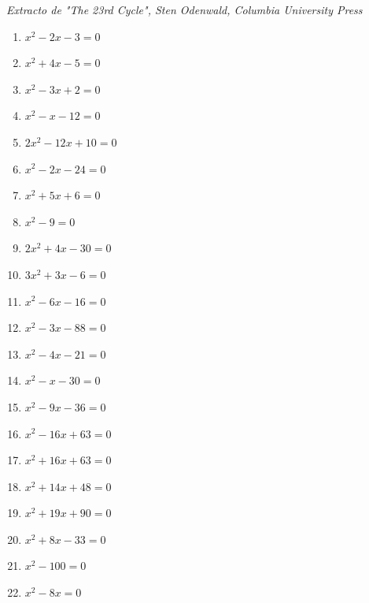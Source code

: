 \documentclass[a4paper]{article}
\newcounter{problema}
\begin{document}
\begin{problema}
\textit{Extracto de "The 23rd Cycle", Sten Odenwald, Columbia University Press}

\vspace{5mm}

\begin{enumerate}
    \item $x^{2} - 2x - 3 = 0$
    \item $x^{2} + 4x - 5 = 0$
    \item $x^{2} - 3x + 2 = 0$
    \item $x^{2} - x - 12 = 0$
    \item $2x^{2} - 12x + 10 = 0$
    \item $x^{2} - 2x - 24 = 0$
    \item $x^{2} + 5x + 6 = 0$
    \item $x^{2} - 9 = 0$
    \item $2x^{2} + 4x - 30 = 0$
    \item $3x^{2} + 3x - 6 = 0$
    \item $x^{2} - 6x - 16 = 0$
    \item $x^{2} - 3x - 88 = 0$
    \item $x^{2} - 4x - 21 = 0$
    \item $x^{2} - x - 30 = 0$
    \item $x^{2} - 9x - 36 = 0$
    \item $x^{2} - 16x + 63 = 0$
    \item $x^{2} + 16x + 63 = 0$
    \item $x^{2} + 14x + 48 = 0$
    \item $x^{2} + 19x + 90 = 0$
    \item $x^{2} + 8x - 33 = 0$
    \item $x^{2} - 100 = 0$
    \item $x^{2} - 8x = 0$
\end{enumerate}

\vspace{5mm}


\end{problema}
\end{document}
